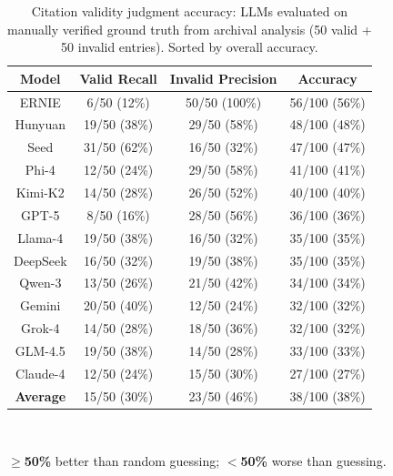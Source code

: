 \begin{table}[t]
\centering
\caption{Citation validity judgment accuracy: LLMs evaluated on manually verified ground truth from archival analysis (50 valid + 50 invalid entries). Sorted by overall accuracy.}
\label{tab:judge_accuracy}
\footnotesize
{}
\begin{tabular}{cccc}
\toprule
\textbf{Model} & \cellcolor{gray!12}\textbf{Valid Recall} & \cellcolor{gray!12}\textbf{Invalid Precision} & \cellcolor{gray!12}\textbf{Accuracy} \\
\midrule
ERNIE & \cellcolor{red!16}6/50 (12\%) & \cellcolor{green!20}50/50 (100\%) & \cellcolor{green!10}56/100 (56\%) \\
Hunyuan & \cellcolor{green!7}19/50 (38\%) & \cellcolor{green!10}29/50 (58\%) & \cellcolor{red!9}48/100 (48\%) \\
Seed & \cellcolor{green!16}31/50 (62\%) & \cellcolor{red!12}16/50 (32\%) & \cellcolor{red!10}47/100 (47\%) \\
Phi-4 & \cellcolor{red!11}12/50 (24\%) & \cellcolor{green!10}29/50 (58\%) & \cellcolor{red!12}41/100 (41\%) \\
Kimi-K2 & \cellcolor{red!9}14/50 (28\%) & \cellcolor{green!7}26/50 (52\%) & \cellcolor{red!13}40/100 (40\%) \\
GPT-5 & \cellcolor{red!15}8/50 (16\%) & \cellcolor{green!9}28/50 (56\%) & \cellcolor{red!15}36/100 (36\%) \\
Llama-4 & \cellcolor{green!7}19/50 (38\%) & \cellcolor{red!12}16/50 (32\%) & \cellcolor{red!15}35/100 (35\%) \\
DeepSeek & \cellcolor{red!7}16/50 (32\%) & \cellcolor{red!9}19/50 (38\%) & \cellcolor{red!15}35/100 (35\%) \\
Qwen-3 & \cellcolor{red!10}13/50 (26\%) & \cellcolor{red!7}21/50 (42\%) & \cellcolor{red!16}34/100 (34\%) \\
Gemini & \cellcolor{green!9}20/50 (40\%) & \cellcolor{red!16}12/50 (24\%) & \cellcolor{red!17}32/100 (32\%) \\
Grok-4 & \cellcolor{red!9}14/50 (28\%) & \cellcolor{red!10}18/50 (36\%) & \cellcolor{red!17}32/100 (32\%) \\
GLM-4.5 & \cellcolor{green!7}19/50 (38\%) & \cellcolor{red!14}14/50 (28\%) & \cellcolor{red!16}33/100 (33\%) \\
Claude-4 & \cellcolor{red!11}12/50 (24\%) & \cellcolor{red!13}15/50 (30\%) & \cellcolor{red!19}27/100 (27\%) \\
\midrule
\textbf{Average} & \cellcolor{red!8}15/50 (30\%) & \cellcolor{red!7}23/50 (46\%) & \cellcolor{red!14}38/100 (38\%) \\
\bottomrule
\end{tabular}\\[0.5em]
\raggedright\footnotesize\colorbox{green!15}{\textbf{$\geq$50\%}} better than random guessing;
\colorbox{red!15}{\textbf{$<$50\%}} worse than guessing.
\end{table}

